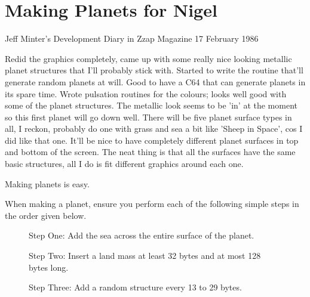 \chapter{Making Planets for Nigel} 
\renewcommand*{\thesubfigure}{(\arabic{subfigure})}

\begin{q}{Jeff Minter's Development Diary in Zzap Magazine\cite{planner}}
17 February 1986 

Redid the graphics completely, came up with some really
nice looking metallic planet structures that I'll probably stick with. Started
to write the  routine that'll generate random planets at will. Good to
have a C64 that can generate planets in its spare time. Wrote pulsation
routines for the colours; looks well good with some of the planet structures.
The metallic look seems to be 'in' at the moment so this first planet will go
down well. There will be five planet surface types in all, I reckon, probably
do one with grass and sea a bit like 'Sheep in Space', cos I did like that one.
It'll be nice to have completely different planet surfaces in top and bottom of
the screen. The neat thing is that all the surfaces have the same basic
structures, all I do is fit different graphics around each one. 
\end{q}

Making planets is easy. 

When making a planet, ensure you perform each of the following
simple steps in the order given below.

\begin{figure}[H]
  {
    \begin{adjustbox}{width=10cm,center}
    \end{adjustbox}
  }\caption[]{Step One: Add the sea across the entire surface of the planet.}
\end{figure}

\begin{figure}[H]
  {
    \begin{adjustbox}{width=10cm,center}
    \end{adjustbox}
  }\caption[]{Step Two: Insert a land mass at least 32 bytes and at most 128 bytes long.}
\end{figure}

\begin{figure}[H]
  {
    \begin{adjustbox}{width=10cm,center}
    \end{adjustbox}
  }\caption[]{Step Three: Add a random structure every 13 to 29 bytes.}
\end{figure}

